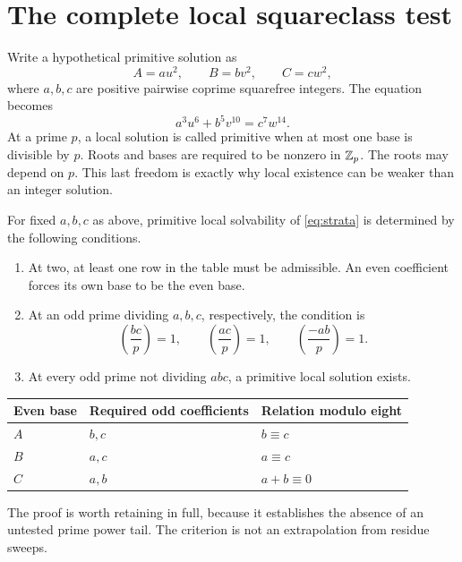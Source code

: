 \section{The complete local squareclass test}\label{sec:strata}
Write a hypothetical primitive solution as
\[
A=au^2,\qquad B=bv^2,\qquad C=cw^2,
\]
where $a,b,c$ are positive pairwise coprime squarefree integers. The equation becomes
\begin{equation}\label{eq:strata}
a^3u^6+b^5v^{10}=c^7w^{14}.
\end{equation}
At a prime $p$, a local solution is called primitive when at most one base is divisible by $p$. Roots and bases are required to be nonzero in $\mathbb Z_p$. The roots may depend on $p$. This last freedom is exactly why local existence can be weaker than an integer solution.

\begin{theorem}\label{thm:localstrata}
For fixed $a,b,c$ as above, primitive local solvability of \eqref{eq:strata} is determined by the following conditions.
\begin{enumerate}
\item At two, at least one row in the table must be admissible. An even coefficient forces its own base to be the even base.
\item At an odd prime dividing $a,b,c$, respectively, the condition is
\[
\left(\frac{bc}{p}\right)=1,\qquad
\left(\frac{ac}{p}\right)=1,\qquad
\left(\frac{-ab}{p}\right)=1.
\]
\item At every odd prime not dividing $abc$, a primitive local solution exists.
\end{enumerate}
\end{theorem}
\begin{center}
\begin{tabular}{lll}\toprule
Even base&Required odd coefficients&Relation modulo eight\\\midrule
$A$&$b,c$&$b\equiv c$\\
$B$&$a,c$&$a\equiv c$\\
$C$&$a,b$&$a+b\equiv0$\\\bottomrule
\end{tabular}
\end{center}
The proof is worth retaining in full, because it establishes the absence of an untested prime power tail. The criterion is not an extrapolation from residue sweeps.


